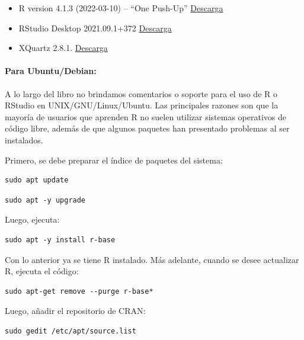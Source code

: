 \documentclass[
]{article}
\providecommand{\tightlist}{%
  \setlength{\itemsep}{0pt}\setlength{\parskip}{0pt}}
\theoremstyle{definition}
\theoremstyle{definition}
\theoremstyle{definition}
\theoremstyle{definition}
\theoremstyle{remark}
\begin{document}
\begin{itemize}
\tightlist
\item
  R version 4.1.3 (2022-03-10) -- ``One Push-Up'' \href{https://cran.r-project.org/bin/macosx/base/R-4.1.3.pkg}{Descarga}
\item
  RStudio Desktop 2021.09.1+372 \href{https://download1.rstudio.org/desktop/macos/RStudio-2022.02.0-443.dmg}{Descarga}
\item
  XQuartz 2.8.1. \href{https://github.com/XQuartz/XQuartz/releases/download/XQuartz-2.8.1/XQuartz-2.8.1.dmg}{Descarga}
\end{itemize}

\hypertarget{para-ubuntudebian}{%
\paragraph*{Para Ubuntu/Debian:}\label{para-ubuntudebian}}

A lo largo del libro no brindamos comentarios o soporte para el uso de R o RStudio en UNIX/GNU/Linux/Ubuntu. Las principales razones son que la mayoría de usuarios que aprenden R no suelen utilizar sistemas operativos de código libre, además de que algunos paquetes han presentado problemas al ser instalados.

Primero, se debe preparar el índice de paquetes del sistema:

\begin{verbatim}
sudo apt update
\end{verbatim}

\begin{verbatim}
sudo apt -y upgrade
\end{verbatim}

Luego, ejecuta:

\begin{verbatim}
sudo apt -y install r-base
\end{verbatim}

Con lo anterior ya se tiene R instalado. Más adelante, cuando se desee actualizar R, ejecuta el código:

\begin{verbatim}
sudo apt-get remove --purge r-base*
\end{verbatim}

Luego, añadir el repositorio de CRAN:

\begin{verbatim}
sudo gedit /etc/apt/source.list
\end{verbatim}
\end{document}
